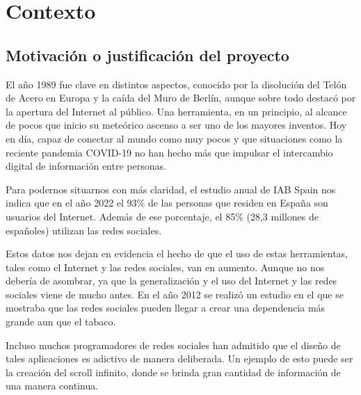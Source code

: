 \chapter{Contexto}\label{ch:context}

\section{Motivación o justificación del proyecto}

\vspace{0.3cm}

El año 1989 fue clave en distintos aspectos, conocido por la disolución del Telón de Acero en Europa y la caída del Muro de Berlín, aunque sobre todo destacó por la apertura del Internet al público. Una herramienta, en un principio, al alcance de pocos que inicio su meteórico ascenso a ser uno de los mayores inventos. Hoy en día, capaz de conectar al mundo como muy pocos y que situaciones como la reciente pandemia COVID-19 no han hecho más que impulsar el intercambio digital de información entre personas.

\vspace{0.3cm}

Para podernos situarnos con más claridad, el estudio anual de IAB Spain nos indica que en el año 2022 el 93\% de las personas que residen en España son usuarios del Internet. Además de ese porcentaje, el 85\% (28,3 millones de españoles) utilizan las redes sociales. \cite{Studio-Aloha}

\vspace{0.3cm}

Estos datos nos dejan en evidencia el hecho de que el uso de estas herramientas, tales como el Internet y las redes sociales, van en aumento. Aunque no nos debería de asombrar, ya que la generalización y el uso del Internet y las redes sociales viene de mucho antes. En el año 2012 se realizó un estudio en el que se mostraba que las redes sociales pueden llegar a crear una dependencia más grande aun que el tabaco. \cite{Tabaco-Study}

\vspace{0.3cm}

Incluso muchos programadores de redes sociales han admitido que el diseño de tales aplicaciones es adictivo de manera deliberada. Un ejemplo de esto puede ser la creación del scroll infinito, donde se brinda gran cantidad de información de una manera continua. \cite{Social-Deliberately}

